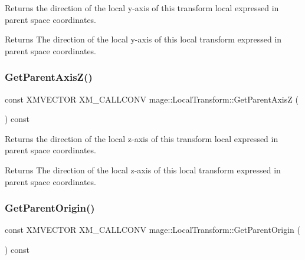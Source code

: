 Returns the direction of the local y-\/axis of this transform local expressed in parent space coordinates.

\begin{DoxyReturn}{Returns}
The direction of the local y-\/axis of this local transform expressed in parent space coordinates. 
\end{DoxyReturn}
\mbox{\label{classmage_1_1_local_transform_acc8dd9207592af2db959b609bc14ae1f}} 
\subsubsection{\texorpdfstring{Get\+Parent\+Axis\+Z()}{GetParentAxisZ()}}
{\footnotesize\ttfamily const X\+M\+V\+E\+C\+T\+OR X\+M\+\_\+\+C\+A\+L\+L\+C\+O\+NV mage\+::\+Local\+Transform\+::\+Get\+Parent\+AxisZ (\begin{DoxyParamCaption}{ }\end{DoxyParamCaption}) const\hspace{0.3cm}{\ttfamily [noexcept]}}

Returns the direction of the local z-\/axis of this transform local expressed in parent space coordinates.

\begin{DoxyReturn}{Returns}
The direction of the local z-\/axis of this local transform expressed in parent space coordinates. 
\end{DoxyReturn}
\mbox{\label{classmage_1_1_local_transform_ad3577335f3be3237c89fe0b02b3cfd53}} 
\subsubsection{\texorpdfstring{Get\+Parent\+Origin()}{GetParentOrigin()}}
{\footnotesize\ttfamily const X\+M\+V\+E\+C\+T\+OR X\+M\+\_\+\+C\+A\+L\+L\+C\+O\+NV mage\+::\+Local\+Transform\+::\+Get\+Parent\+Origin (\begin{DoxyParamCaption}{ }\end{DoxyParamCaption}) const\hspace{0.3cm}{\ttfamily [noexcept]}}

